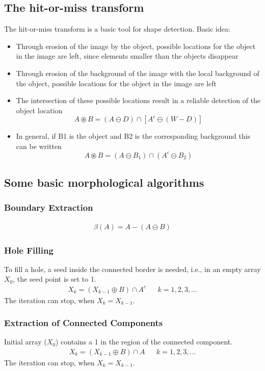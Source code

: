 \subsection{The hit-or-miss transform}
The hit-or-miss transform is a basic tool for shape detection. Basic idea:
\begin{itemize}
	\item Through erosion of the image by the object, possible locations for the object in the image are left, since elements smaller than the objects disappear
	
	\item Through erosion of the background of the image with the local background of the object, possible locations for the object in the image are left
	
	\item The intersection of these possible locations result in a reliable  detection of the object location
	\[
		A \circledast B = (A \ominus D) \cap [ A^c \ominus (W-D)]
	\]
	
	\item In general, if B1 is the object and B2 is the corresponding background this can be written
	\[
		A \circledast B = (A \ominus B_1)\cap (A^c \ominus B_2)	
	\]	
\end{itemize}


\subsection{Some basic morphological algorithms}
\subsubsection{Boundary Extraction}
\begin{align*}
\beta(A)=A-(A\ominus B)
\end{align*}

\subsubsection{Hole Filling}
To fill a hole, a seed inside the connected border is needed, i.e., in an empty array $X_0$, the seed point is set to 1.
\begin{align*}
X_k=(X_{k-1}\oplus B)\cap A^c && k=1,2,3,\ldots
\end{align*}
The iteration can stop, when $X_k = X_{k-1}$.

\subsubsection{Extraction of Connected Components}
Initial array ($X_0$) contains a 1 in the region of the connected component.
\begin{align*}
X_k=(X_{k-1}\oplus B)\cap A && k=1,2,3,\ldots
\end{align*}
The iteration can stop, when $X_k = X_{k-1}$.

